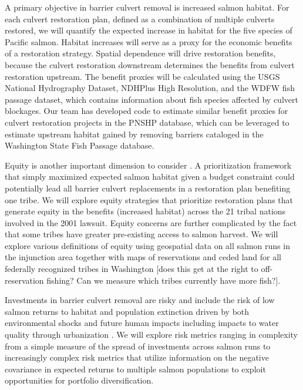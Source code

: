 \documentclass[12pt]{elsarticle}
\begin{document}
A primary objective in barrier culvert removal is increased salmon habitat. For each culvert restoration plan, defined as a combination of multiple culverts restored, we will quantify the expected increase in habitat for the five species of Pacific salmon. Habitat increases will serve as a proxy for the economic benefits of a restoration strategy. Spatial dependence will drive restoration benefits, because the culvert restoration downstream determines the benefits from culvert restoration upstream. The benefit proxies will be calculated using the USGS National Hydrography Dataset, NDHPlus High Resolution, and the WDFW fish passage dataset, which contains information about fish species affected by culvert blockages.  Our team has developed code to estimate similar benefit proxies for culvert restoration projects in the PNSHP database, which can be leveraged to estimate upstream habitat gained by removing barriers cataloged in the Washington State Fish Passage database. 

%
Equity is another important dimension to consider . A prioritization framework that simply maximized expected salmon habitat given a budget constraint could potentially lead all barrier culvert replacements in a restoration plan benefiting one tribe. We will explore equity strategies that prioritize restoration plans that generate equity in the benefits (increased habitat) across the 21 tribal nations involved in the 2001 lawsuit. Equity concerns are further complicated by the fact that some tribes have greater pre-existing access to salmon harvest. We will explore various definitions of equity using geospatial data on all salmon runs in the injunction area together with maps of reservations and ceded land for all federally recognized tribes in Washington [does this get at the right to off-reservation fishing? Can we measure which tribes currently have more fish?]. 

%
Investments in barrier culvert removal are risky and include the risk of low salmon returns to habitat and population extinction driven by both environmental shocks and future human impacts including impacts to water quality through urbanization \citep{ettinger2021prioritizing}. We will explore risk metrics ranging in complexity from a simple measure of the spread of investments across salmon runs to increasingly complex risk metrics that utilize information on the negative covariance in expected returns to multiple salmon populations to exploit opportunities for portfolio diversification.  
\end{document}

